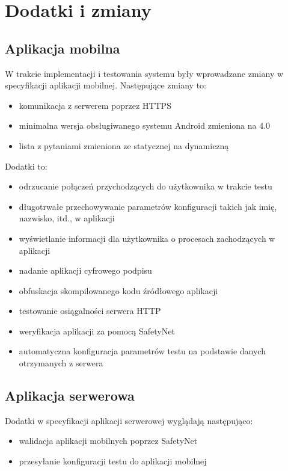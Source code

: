 \documentclass[eng]{mgr}
\begin{document}
		\section{Dodatki i zmiany}
		
			\subsection{Aplikacja mobilna}
			W trakcie implementacji i testowania systemu były wprowadzane zmiany w specyfikacji aplikacji mobilnej. Następujące zmiany to:
			\begin{itemize}
				\item komunikacja z serwerem poprzez HTTPS
				\item minimalna wersja obsługiwanego systemu Android zmieniona na 4.0
				\item lista z pytaniami zmieniona ze statycznej na dynamiczną
			\end{itemize}
			Dodatki to:
			\begin{itemize}
				\item odrzucanie połączeń przychodzących do użytkownika w trakcie testu
				\item długotrwałe przechowywanie parametrów konfiguracji takich jak imię, nazwisko, itd., w aplikacji
				\item wyświetlanie informacji dla użytkownika o procesach zachodzących w aplikacji
				\item nadanie aplikacji cyfrowego podpisu
				\item obfuskacja skompilowanego kodu źródłowego aplikacji
				\item testowanie osiągalności serwera HTTP
				\item weryfikacja aplikacji za pomocą SafetyNet
				\item automatyczna konfiguracja parametrów testu na podstawie danych otrzymanych z serwera
			\end{itemize}
		
			\subsection{Aplikacja serwerowa}
			Dodatki w specyfikacji aplikacji serwerowej wyglądają następująco:
			\begin{itemize}
				\item walidacja aplikacji mobilnych poprzez SafetyNet
				\item przesyłanie konfiguracji testu do aplikacji mobilnej
			\end{itemize}
		
\end{document}
